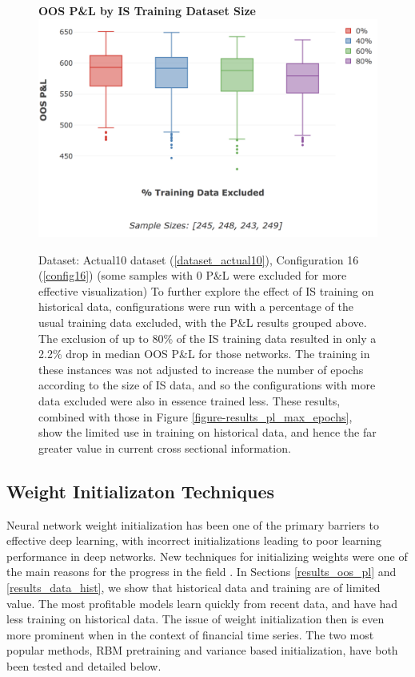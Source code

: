 \documentclass[a4paper,11pt,oneside]{article}
\theoremstyle{plain}
\theoremstyle{definition}
\begin{document}
	
	\begin{figure}[H]
		\centering 
		\textbf{OOS P\&L by IS Training Dataset Size}
		\includegraphics[scale=0.4]{images/results/8_3_historical/training_data_excluded.png}
		\caption[OOS P\&L by IS Training Dataset Size]{
			Dataset: Actual10 dataset (\ref{dataset_actual10}), Configuration 16 (\ref{config16}) (some samples with 0 P\&L were excluded for more effective visualization)
			\newline To further explore the effect of IS training on historical data, configurations were run with a percentage of the usual training data excluded, with the P\&L results grouped above. The exclusion of up to 80\% of the IS training data resulted in only a 2.2\% drop in median OOS P\&L for those networks. The training in these instances was not adjusted to increase the number of epochs according to the size of IS data, and so the configurations with more data excluded were also in essence trained less. These results, combined with those in Figure \ref{figure-results_pl_max_epochs}, show the limited use in training on historical data, and hence the far greater value in current cross sectional information.}
		\label{figure-results_it3_validationset}
	\end{figure}
	
	
	\newpage
	
	\subsection{Weight Initializaton Techniques}\label{results_init}
	
	Neural network weight initialization has been one of the primary barriers to effective deep learning, with incorrect initializations leading to poor learning performance in deep networks. New techniques for initializing weights were one of the main reasons for the progress in the field \citep{Hinton2}. In Sections \ref{results_oos_pl} and \ref{results_data_hist}, we show that historical data and training are of limited value. The most profitable models learn quickly from recent data, and have had less training on historical data. The issue of weight initialization then is even more prominent when in the context of financial time series. The two most popular methods, RBM pretraining and variance based initialization, have both been tested and detailed below.
	
\end{document}

